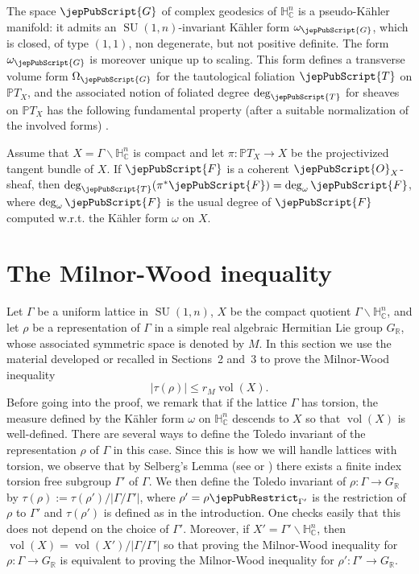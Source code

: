 The space $\jepPubScript{G}$ of complex geodesics of $\mathbb H^n_{\mathbb C}$ is a pseudo-Kähler manifold: it admits an $\operatorname{SU}(1,n)$-invariant Kähler form $\omega_{\jepPubScript{G}}$, which is closed, of type $(1,1)$, non degenerate, but not positive definite. The form $\omega_{\jepPubScript{G}}$ is moreover unique up to scaling. This form defines a transverse volume form $\Omega_{\jepPubScript{G}}$ for the tautological foliation $\jepPubScript{T}$ on $\mathbb PT_X$, and the associated notion of foliated degree $\deg_{\jepPubScript{T}}$ for sheaves on $\mathbb PT_X$ has the following fundamental property (after a suitable normalization of the involved forms) \cite[Prop.~3.1]{jep93KM17}.
\begin{proposition}
Assume that $X=\Gamma\backslash\mathbb H^n_{\mathbb C}$ is compact and let $\pi:\mathbb PT_X\to X$ be the projectivized tangent bundle of $X$. If $\jepPubScript{F}$ is a coherent $\jepPubScript{O}_X$-sheaf, then $\deg_{\jepPubScript{T}}(\pi^*\jepPubScript{F})=\deg_\omega\jepPubScript{F}$, where $\deg_\omega\jepPubScript{F}$ is the usual degree of $\jepPubScript{F}$ computed w.r.t. the Kähler form $\omega$ on $X$.
\end{proposition}

\section{The Milnor-Wood inequality}
Let $\Gamma$ be a uniform lattice in $\operatorname{SU}(1,n)$, $X$ be the compact quotient $\Gamma\backslash\mathbb H^n_{\mathbb C}$, and let $\rho$ be a representation of $\Gamma$ in a simple real algebraic Hermitian Lie group $G_{\mathbb R}$, whose associated symmetric space is denoted by $M$. In this section we use the material developed or recalled in Sections~2 and~3 to prove the Milnor-Wood inequality
\[
|\tau(\rho)|\leqslant r_M\operatorname{vol}(X).
\]
Before going into the proof, we remark that if the lattice $\Gamma$ has torsion, the measure defined by the Kähler form $\omega$ on $\mathbb H^n_{\mathbb C}$ descends to $X$ so that $\operatorname{vol}(X)$ is well-defined. There are several ways to define the Toledo invariant of the representation $\rho$ of $\Gamma$ in this case. Since this is how we will handle lattices with torsion, we observe that by Selberg's Lemma (see \cite[p.~327]{jep93Rat06} or \cite{jep93Sel60}) there exists a finite index torsion free subgroup $\Gamma'$ of $\Gamma$. We then define the Toledo invariant of $\rho:\Gamma\to G_{\mathbb R}$ by $\tau(\rho):=\tau(\rho')/|\Gamma/\Gamma'|$, where $\rho'=\rho\jepPubRestrict_{\Gamma'}$ is the restriction of $\rho$ to $\Gamma'$ and $\tau(\rho')$ is defined as in the introduction. One checks easily that this does not depend on the choice of $\Gamma'$. Moreover, if $X'=\Gamma'\backslash\mathbb H^n_{\mathbb C}$, then $\operatorname{vol}(X)=\operatorname{vol}(X')/|\Gamma/\Gamma'|$ so that proving the Milnor-Wood inequality for $\rho:\Gamma\to G_{\mathbb R}$ is equivalent to proving the Milnor-Wood inequality for $\rho':\Gamma'\to G_{\mathbb R}$.

